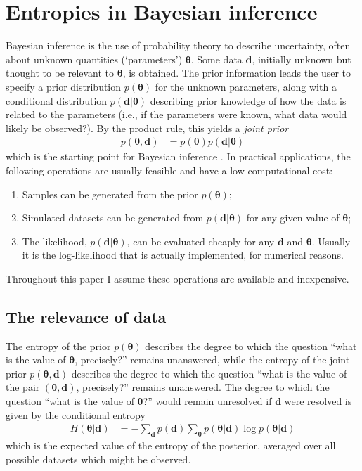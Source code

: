 \documentclass[entropy,article,accept,oneauthor,pdftex,10pt,a4paper]{mdpi}
\newcommand{\revision}{\color{darkblue}}
\renewcommand{\d}{\boldsymbol{d}}
\newcommand{\x}{\boldsymbol{\theta}}
\begin{document}
\section{Entropies in Bayesian inference}

Bayesian inference is the use of probability theory to
describe uncertainty, often about unknown quantities
(`parameters') $\x$. Some data $\d$, initially unknown but
thought to be relevant to $\x$, is obtained.
The prior information leads the
user to specify a prior distribution $p(\x)$ for the unknown parameters,
along with a conditional distribution $p(\d | \x)$ describing prior knowledge
of how the data is related to the parameters
(i.e., if the parameters were known, what data would likely be observed?).
By the product rule, this yields a {\em joint prior}
\begin{align}
p(\x, \d) &= p(\x)p(\d | \x)
\end{align}
which is the starting point for
Bayesian inference \citep{caticha2008lectures, caticha2006updating}.
In practical applications, the following operations
are usually feasible and have a low computational cost:
\begin{enumerate}
  \item {\revision Samples} can be generated from the prior $p(\x)$;
  \item Simulated datasets can be generated from $p(\d | \x)$ for any
        given value of $\x$;
  \item The likelihood, $p(\d | \x)$, can be evaluated cheaply for any
        $\d$ and $\x$. Usually it is the log-likelihood that is actually
        implemented, for numerical reasons.
\end{enumerate}
Throughout this paper I assume these operations are available and inexpensive.

\subsection{The relevance of data}

The entropy of the prior $p(\x)$ describes the degree to which the question
``what is the value of $\x$, precisely?'' remains unanswered, while the
entropy of the joint prior $p(\x, \d)$
describes the degree to which the question
``what is the value of the pair $(\x, \d)$, precisely?'' remains unanswered.
The degree to which the question ``what is the value of $\x$?'' would remain
unresolved if $\d$ were resolved is given by the
conditional entropy
\begin{align}
H(\x | \d) &= - \sum_{\d} p(\d) \sum_{\x} p(\x | \d) \log p(\x | \d)
\end{align}
which is the expected value of the entropy of the posterior, averaged over
all possible datasets which might be observed. 
\end{document}
